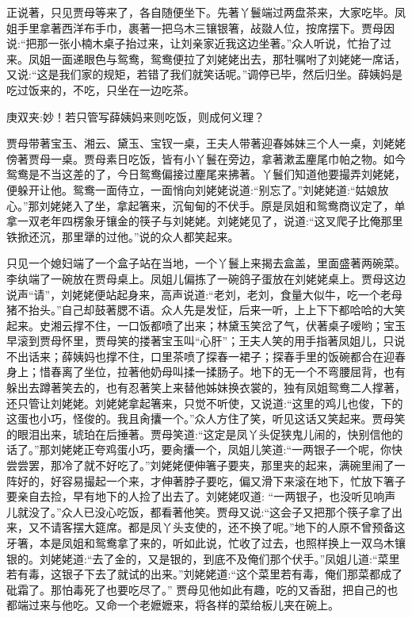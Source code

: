 \begin{parag}
    正说著，只见贾母等来了，各自随便坐下。先著丫鬟端过两盘茶来，大家吃毕。凤姐手里拿著西洋布手巾，裹著一把乌木三镶银箸，敁敠人位，按席摆下。贾母因说:“把那一张小楠木桌子抬过来，让刘亲家近我这边坐著。”众人听说，忙抬了过来。凤姐一面递眼色与鸳鸯，鸳鸯便拉了刘姥姥出去，那牡嘱咐了刘姥姥一席话，又说:“这是我们家的规矩，若错了我们就笑话呢。”调停已毕，然后归坐。薛姨妈是吃过饭来的，不吃，只坐在一边吃茶。\begin{note}庚双夹:妙！若只管写薛姨妈来则吃饭，则成何义理？\end{note}贾母带著宝玉、湘云、黛玉、宝钗一桌，王夫人带著迎春姊妹三个人一桌，刘姥姥傍著贾母一桌。贾母素日吃饭，皆有小丫鬟在旁边，拿著漱盂麈尾巾帕之物。如今鸳鸯是不当这差的了，今日鸳鸯偏接过麈尾来拂著。丫鬟们知道他要撮弄刘姥姥，便躲开让他。鸳鸯一面侍立，一面悄向刘姥姥说道:“别忘了。”刘姥姥道:“姑娘放心。”那刘姥姥入了坐，拿起箸来，沉甸甸的不伏手。原是凤姐和鸳鸯商议定了，单拿一双老年四楞象牙镶金的筷子与刘姥姥。刘姥姥见了，说道:“这叉爬子比俺那里铁掀还沉，那里犟的过他。”说的众人都笑起来。
\end{parag}


\begin{parag}
    只见一个媳妇端了一个盒子站在当地，一个丫鬟上来揭去盒盖，里面盛著两碗菜。李纨端了一碗放在贾母桌上。凤姐儿偏拣了一碗鸽子蛋放在刘姥姥桌上。贾母这边说声“请”，刘姥姥便站起身来，高声说道:“老刘，老刘，食量大似牛，吃一个老母猪不抬头。”自己却鼓著腮不语。众人先是发怔，后来一听，上上下下都哈哈的大笑起来。史湘云撑不住，一口饭都喷了出来；林黛玉笑岔了气，伏著桌子嗳哟；宝玉早滚到贾母怀里，贾母笑的搂著宝玉叫“心肝”；王夫人笑的用手指著凤姐儿，只说不出话来；薛姨妈也撑不住，口里茶喷了探春一裙子；探春手里的饭碗都合在迎春身上；惜春离了坐位，拉著他奶母叫揉一揉肠子。地下的无一个不弯腰屈背，也有躲出去蹲著笑去的，也有忍著笑上来替他姊妹换衣裳的，独有凤姐鸳鸯二人撑著，还只管让刘姥姥。刘姥姥拿起箸来，只觉不听使，又说道:“这里的鸡儿也俊，下的这蛋也小巧，怪俊的。我且肏攮一个。”众人方住了笑，听见这话又笑起来。贾母笑的眼泪出来，琥珀在后捶著。贾母笑道:“这定是凤丫头促狭鬼儿闹的，快别信他的话了。”那刘姥姥正夸鸡蛋小巧，要肏攮一个，凤姐儿笑道:“一两银子一个呢，你快尝尝罢，那冷了就不好吃了。”刘姥姥便伸箸子要夹，那里夹的起来，满碗里闹了一阵好的，好容易撮起一个来，才伸著脖子要吃，偏又滑下来滚在地下，忙放下箸子要亲自去捡，早有地下的人捡了出去了。刘姥姥叹道: “一两银子，也没听见响声儿就没了。”众人已没心吃饭，都看著他笑。贾母又说:“这会子又把那个筷子拿了出来，又不请客摆大筵席。都是凤丫头支使的，还不换了呢。”地下的人原不曾预备这牙箸，本是凤姐和鸳鸯拿了来的，听如此说，忙收了过去，也照样换上一双乌木镶银的。刘姥姥道:“去了金的，又是银的，到底不及俺们那个伏手。”凤姐儿道:“菜里若有毒，这银子下去了就试的出来。”刘姥姥道:“这个菜里若有毒，俺们那菜都成了砒霜了。那怕毒死了也要吃尽了。” 贾母见他如此有趣，吃的又香甜，把自己的也都端过来与他吃。又命一个老嬷嬷来，将各样的菜给板儿夹在碗上。
\end{parag}


